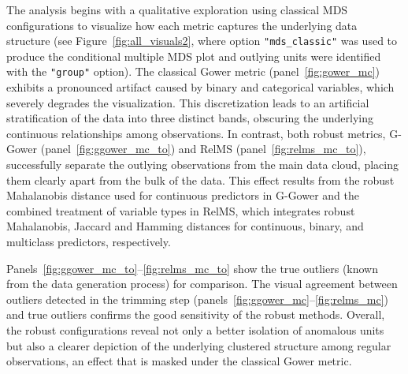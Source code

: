 The analysis begins with a qualitative exploration using classical MDS configurations to visualize how each metric captures the underlying data structure (see Figure~\ref{fig:all_visuals2}, where option \texttt{"mds\_classic"} was used to produce the conditional multiple MDS plot and outlying units were identified with the \texttt{"group"} option). The classical Gower metric (panel~\ref{fig:gower_mc}) exhibits a pronounced artifact caused by binary and categorical variables, which severely degrades the visualization. This discretization leads to an artificial stratification of the data into three distinct bands, obscuring the underlying continuous relationships among observations. In contrast, both robust metrics, G-Gower (panel~\ref{fig:ggower_mc_to}) and RelMS (panel~\ref{fig:relms_mc_to}), successfully separate the outlying observations from the main data cloud, placing them clearly apart from the bulk of the data. This effect results from the robust Mahalanobis distance used for continuous predictors in G-Gower and the combined treatment of variable types in RelMS, which integrates robust Mahalanobis, Jaccard and Hamming distances for continuous, binary, and multiclass predictors, respectively.

Panels~\ref{fig:ggower_mc_to}--\ref{fig:relms_mc_to} show the true outliers (known from the data generation process) for comparison. The visual agreement between outliers detected in the trimming step (panels~\ref{fig:ggower_mc}--\ref{fig:relms_mc}) and true outliers confirms the good sensitivity of the robust methods. Overall, the robust configurations reveal not only a better isolation of anomalous units but also a clearer depiction of the underlying clustered structure among regular observations, an effect that is masked under the classical Gower metric.

